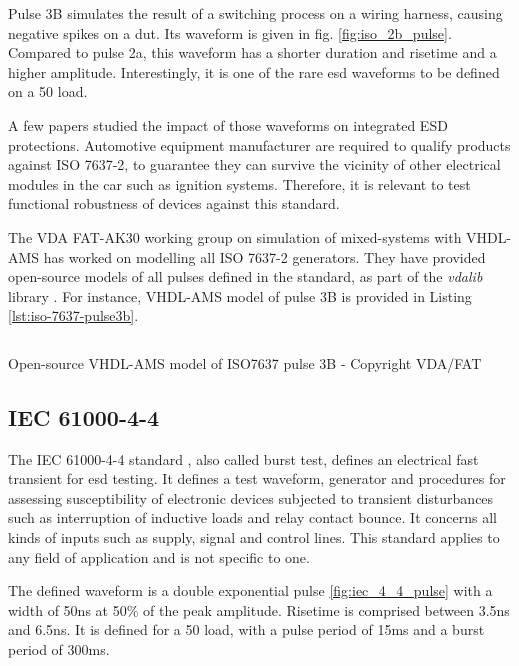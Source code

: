 Pulse 3B simulates the result of a switching process on a wiring harness, causing negative spikes on a \gls{dut}.
Its waveform is given in fig. \ref{fig:iso_2b_pulse}.
Compared to pulse 2a, this waveform has a shorter duration and risetime and a higher amplitude.
Interestingly, it is one of the rare \gls{esd} waveforms to be defined on a 50\textOmega{} load.

A few papers \cite{is-iso7637-real, iso7637-2-new-automotive-reqs, robustness-esd-iso7637} studied the impact of those waveforms on integrated ESD protections.
Automotive equipment manufacturer are required to qualify products against ISO 7637-2, to guarantee they can survive the vicinity of other electrical modules in the car such as ignition systems.
Therefore, it is relevant to test functional robustness of devices against this standard.

The VDA FAT-AK30 working group on simulation of mixed-systems with VHDL-AMS \cite{fat-ak30} has worked on modelling all ISO 7637-2 generators. They have provided open-source models of all pulses defined in the standard, as part of the \textit{vdalib} library \cite{vdalib}.
For instance, VHDL-AMS model of pulse 3B is provided in Listing \ref{lst:iso-7637-pulse3b}.

\begin{code}
\inputminted[frame=single,firstline=157,lastline=228]{VHDL}{src/1/snippets/iso_7637_pulse3b.vhd}
\caption{Open-source VHDL-AMS model of ISO7637 pulse 3B - Copyright VDA/FAT}
\label{lst:iso-7637-pulse3b}
\end{code}


\subsection{IEC 61000-4-4}

The IEC 61000-4-4 standard \cite{iec61000-4-4}, also called burst test, defines an electrical fast transient for \gls{esd} testing.
It defines a test waveform, generator and procedures for assessing susceptibility of electronic devices subjected to transient disturbances such as interruption of inductive loads and relay contact bounce.
It concerns all kinds of inputs such as supply, signal and control lines.
This standard applies to any field of application and is not specific to one.

The defined waveform is a double exponential pulse \ref{fig:iec_4_4_pulse} with a width of 50ns at 50\% of the peak amplitude.
Risetime is comprised between 3.5ns and 6.5ns.
It is defined for a 50\textOmega{} load, with a pulse period of 15ms and a burst period of 300ms.


